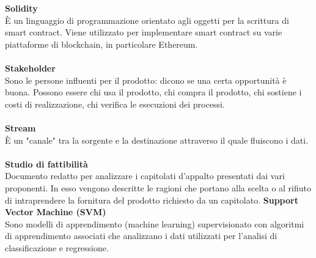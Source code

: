 \textbf{Solidity}\\
È un linguaggio di programmazione orientato agli oggetti per la scrittura di smart contract. Viene utilizzato per implementare smart contract su varie piattaforme di blockchain, in particolare Ethereum. \\ \\
\textbf{Stakeholder}\\
Sono le persone influenti per il prodotto: dicono se una certa opportunità è buona. Possono essere chi usa il prodotto, chi compra il prodotto, chi sostiene i costi di realizzazione, chi verifica le esecuzioni dei processi. \\ \\
\textbf{Stream}\\
È un "canale" tra la sorgente e la destinazione attraverso il quale fluiscono i dati. \\ \\
\textbf{Studio di fattibilità}\\
Documento redatto per analizzare i capitolati d'appalto presentati dai vari proponenti.
In esso vengono descritte le ragioni che portano alla scelta o al rifiuto di intraprendere la fornitura del prodotto richiesto da un capitolato.
\textbf{Support Vector Machine (SVM)}\\
Sono modelli di apprendimento (machine learning) supervisionato con algoritmi di apprendimento associati che analizzano i dati utilizzati per l'analisi di classificazione e regressione. \\ \\
\clearpage